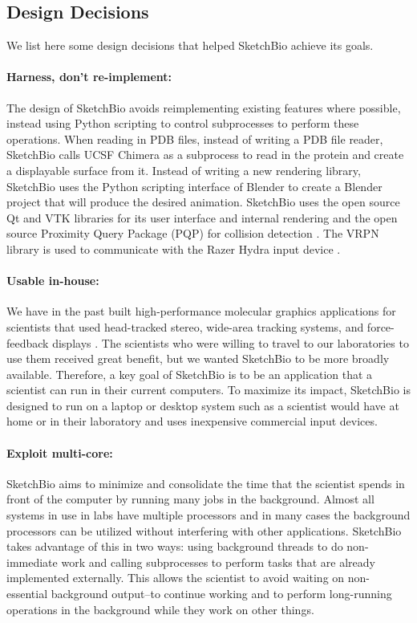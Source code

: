 \documentclass[twocolumn]{bmcart}%
\begin{document}
\subsection*{Design Decisions}
We list here some design decisions that helped SketchBio achieve its goals.

\paragraph*{Harness, don't re-implement:} The design of SketchBio avoids reimplementing existing features where possible, instead using Python scripting to control subprocesses to perform these operations.  When reading in PDB files, instead of writing a PDB file reader, SketchBio calls UCSF Chimera as a subprocess to read in the protein and create a displayable surface from it.  Instead of writing a new rendering library, SketchBio uses the Python scripting interface of Blender to create a Blender project that will produce the desired animation.  SketchBio uses the open source Qt and VTK\cite{VTKbook} libraries for its user interface and internal rendering and the open source Proximity Query Package (PQP) for collision detection \cite{PQP}.  The VRPN library is used to communicate with the Razer Hydra input device \cite{taylor2001vrpn}.

\paragraph*{Usable in-house:} We have in the past built high-performance molecular graphics applications for scientists that used head-tracked stereo, wide-area tracking systems, and force-feedback displays \cite{Arthur,Grant1998,Marshburn2005,Taylor1999,Taylor1997,Taylor1993}.  The scientists who were willing to travel to our laboratories to use them received great benefit, but we wanted SketchBio to be more broadly available.  Therefore, a key goal of SketchBio is to be an application that a scientist can run in their current computers.  To maximize its impact, SketchBio is designed to run on a laptop or desktop system such as a scientist would have at home or in their laboratory and uses inexpensive commercial input devices.

\paragraph*{Exploit multi-core:} SketchBio aims to minimize and consolidate the time that the scientist spends in front of the computer by running many jobs in the background.  Almost all systems in use in labs have multiple processors and in many cases the background processors can be utilized without interfering with other applications.  SketchBio takes advantage of this in two ways: using background threads to do non-immediate work and calling subprocesses to perform tasks that are already implemented externally.  This allows the scientist to avoid waiting on non-essential background output--to continue working and to perform long-running operations in the background while they work on other things.
\end{document}
